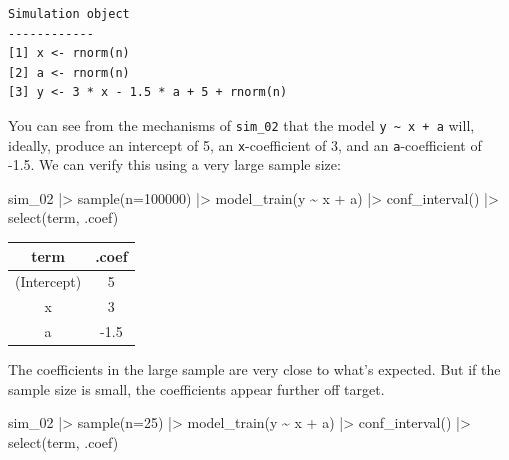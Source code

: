 \documentclass[
  letterpaper,
  DIV=11,
  numbers=noendperiod,
  oneside]{scrartcl}
\newenvironment{Shaded}{\begin{snugshade}}{\end{snugshade}}
\newcommand{\AttributeTok}[1]{\textcolor[rgb]{0.40,0.45,0.13}{#1}}
\newcommand{\DecValTok}[1]{\textcolor[rgb]{0.68,0.00,0.00}{#1}}
\newcommand{\FunctionTok}[1]{\textcolor[rgb]{0.28,0.35,0.67}{#1}}
\newcommand{\NormalTok}[1]{\textcolor[rgb]{0.00,0.23,0.31}{#1}}
\newcommand{\SpecialCharTok}[1]{\textcolor[rgb]{0.37,0.37,0.37}{#1}}
\begin{document}
\begin{verbatim}
Simulation object
------------
[1] x <- rnorm(n)
[2] a <- rnorm(n)
[3] y <- 3 * x - 1.5 * a + 5 + rnorm(n)
\end{verbatim}

You can see from the mechanisms of \texttt{sim\_02} that the model
\texttt{y\ \textasciitilde{}\ x\ +\ a} will, ideally, produce an
intercept of 5, an \texttt{x}-coefficient of 3, and an
\texttt{a}-coefficient of -1.5. We can verify this using a very large
sample size:

\begin{Shaded}
\begin{Highlighting}[]
\NormalTok{sim\_02 }\SpecialCharTok{|\textgreater{}} \FunctionTok{sample}\NormalTok{(}\AttributeTok{n=}\DecValTok{100000}\NormalTok{) }\SpecialCharTok{|\textgreater{}}
  \FunctionTok{model\_train}\NormalTok{(y }\SpecialCharTok{\textasciitilde{}}\NormalTok{ x }\SpecialCharTok{+}\NormalTok{ a) }\SpecialCharTok{|\textgreater{}}
  \FunctionTok{conf\_interval}\NormalTok{() }\SpecialCharTok{|\textgreater{}}
  \FunctionTok{select}\NormalTok{(term, .coef)}
\end{Highlighting}
\end{Shaded}

\begin{longtable}[]{@{}cc@{}}
\toprule\noalign{}
term & .coef \\
\midrule\noalign{}
\endhead
\bottomrule\noalign{}
\endlastfoot
(Intercept) & 5 \\
x & 3 \\
a & -1.5 \\
\end{longtable}

The coefficients in the large sample are very close to what's expected.
But if the sample size is small, the coefficients appear further off
target.

\begin{Shaded}
\begin{Highlighting}[]
\NormalTok{sim\_02 }\SpecialCharTok{|\textgreater{}} \FunctionTok{sample}\NormalTok{(}\AttributeTok{n=}\DecValTok{25}\NormalTok{) }\SpecialCharTok{|\textgreater{}}
  \FunctionTok{model\_train}\NormalTok{(y }\SpecialCharTok{\textasciitilde{}}\NormalTok{ x }\SpecialCharTok{+}\NormalTok{ a) }\SpecialCharTok{|\textgreater{}}
  \FunctionTok{conf\_interval}\NormalTok{() }\SpecialCharTok{|\textgreater{}}
  \FunctionTok{select}\NormalTok{(term, .coef)}
\end{Highlighting}
\end{Shaded}
\end{document}
